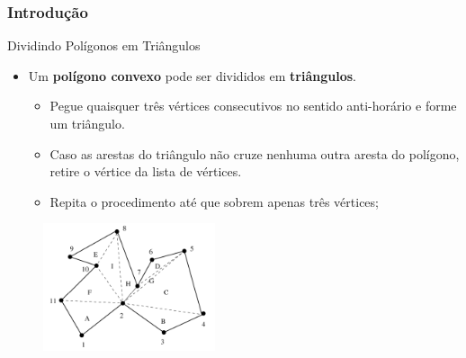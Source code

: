 \documentclass{beamer}
\begin{document}
\begin{frame}
\frametitle{Introdução}

		\begin{block}{Dividindo Polígonos em Triângulos}
		\begin{itemize}
			\item Um \textbf{polígono convexo} pode ser divididos em \textbf{triângulos}.
			\begin{itemize}
				\item Pegue quaisquer três vértices consecutivos no sentido anti-horário e forme um triângulo.
				\item Caso as arestas do triângulo não cruze nenhuma outra aresta do polígono, retire o vértice da lista de vértices.
				\item Repita o procedimento até que sobrem apenas três vértices;
			\end{itemize}
		\end{itemize}
		\end{block}
		
		\begin{figure}[!h]
			\begin{center}
				\includegraphics[width=0.45\textwidth]{Figures/TriVan}
			\end{center}
		\end{figure}
	
\end{frame}
\end{document}

